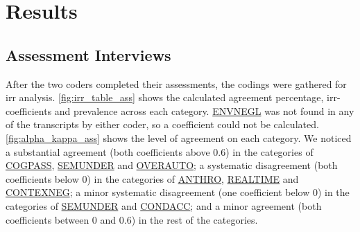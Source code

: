 \chapter{Results}\label{results}

\section{Assessment Interviews}

After the two coders completed their assessments, the codings were gathered for \gls{irr} analysis. \autoref{fig:irr_table_ass} shows the calculated agreement percentage, \gls{irr}-coefficients and prevalence across each category. \hyperref[envnegl]{ENVNEGL} was not found in any of the transcripts by either coder, so a coefficient could not be calculated. \autoref{fig:alpha_kappa_ass} shows the level of agreement on each category. We noticed a substantial agreement (both coefficients above 0.6) in the categories of \hyperref[cogpass]{COGPASS}, \hyperref[semunder]{SEMUNDER} and \hyperref[overauto]{OVERAUTO};
a systematic disagreement (both coefficients below 0) in the categories of \hyperref[anthro]{ANTHRO}, \hyperref[realtime]{REALTIME} and \hyperref[contexneg]{CONTEXNEG};
a minor systematic disagreement (one coefficient below 0) in the categories of \hyperref[semunder]{SEMUNDER} and \hyperref[condacc]{CONDACC}; and a minor agreement (both coefficients between 0 and 0.6) in the rest of the categories.

